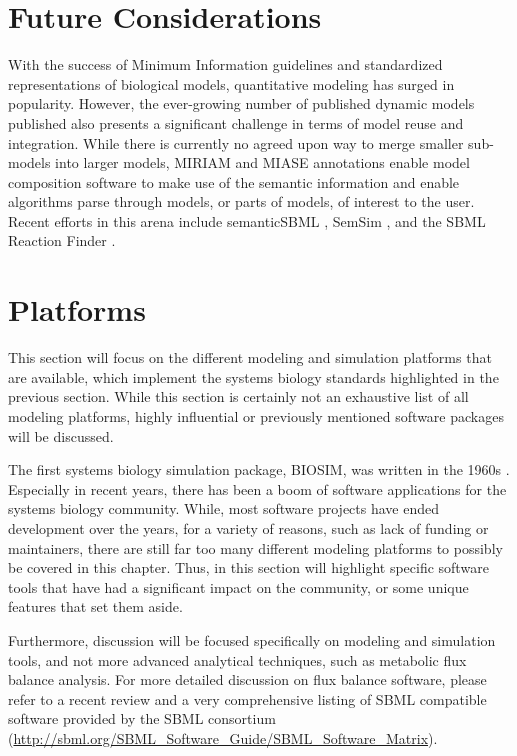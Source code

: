 \section{Future Considerations}

With the success of Minimum Information guidelines and standardized
representations of biological models, quantitative modeling has surged
in popularity. However, the ever-growing number of published dynamic
models published also presents a significant challenge in terms of model
reuse and integration. While there is currently no agreed upon way to
merge smaller sub- models into larger models, MIRIAM and MIASE
annotations enable model composition software to make use of the
semantic information and enable algorithms parse through models, or
parts of models, of interest to the user. Recent efforts in this arena
include semanticSBML \autocite{krause2010annotation}, SemSim
\autocite{neal2009advances}, and the SBML Reaction Finder
\autocite{neal2012sbml}.

\section{Platforms}

This section will focus on the different modeling and simulation
platforms that are available, which implement the systems biology
standards highlighted in the previous section. While this section is
certainly not an exhaustive list of all modeling platforms, highly
influential or previously mentioned software packages will be discussed.

The first systems biology simulation package, BIOSIM, was written in the
1960s \autocite{Ga68}. Especially in recent years, there has been a boom
of software applications for the systems biology community. While, most
software projects have ended development over the years, for a variety
of reasons, such as lack of funding or maintainers, there are still far
too many different modeling platforms to possibly be covered in this
chapter. Thus, in this section will highlight specific software tools
that have had a significant impact on the community, or some unique
features that set them aside.

Furthermore, discussion will be focused specifically on modeling and
simulation tools, and not more advanced analytical techniques, such as
metabolic flux balance analysis. For more detailed discussion on flux
balance software, please refer to a recent review
\autocite{copeland2012computational} and a very comprehensive listing of
SBML compatible software provided by the SBML consortium
(\url{http://sbml.org/SBML_Software_Guide/SBML_Software_Matrix}).

